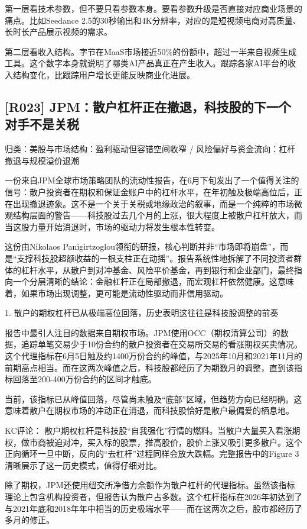 \documentclass[11pt]{ctexart}
\begin{document}
第一层看技术参数，但不要只看参数本身。要看参数升级是否直接对应商业场景的痛点。比如Seedance 2.5的30秒输出和4K分辨率，对应的是短视频电商对高质量、长时长产品展示视频的需求。

第二层看收入结构。字节在MaaS市场接近50\%的份额中，超过一半来自视频生成工具。这个数字本身就说明了哪类AI产品真正在产生收入。跟踪各家AI平台的收入结构变化，比跟踪用户增长更能反映商业化进展。

\subsection{[R023] JPM：散户杠杆正在撤退，科技股的下一个对手不是关税}
{\small\color{refgray}归类：美股与市场结构：盈利驱动但容错空间收窄 / 风险偏好与资金流向：杠杆撤退与规模溢价退潮}

一份来自JPM全球市场策略团队的流动性报告，在6月下旬发出了一个值得关注的信号：散户投资者在期权和保证金账户中的杠杆水平，在年初触及极端高位后，正在出现撤退迹象。这不是一个关于关税或地缘政治的叙事，而是一个纯粹的市场微观结构层面的警告——科技股过去几个月的上涨，很大程度上被散户杠杆放大，而当这股力量开始消退时，市场的驱动力将发生根本性转变。

这份由Nikolaos Panigirtzoglou领衔的研报，核心判断并非“市场即将崩盘”，而是“支撑科技股超额收益的一根支柱正在动摇”。报告系统性地拆解了不同投资者群体的杠杆水平，从散户到对冲基金、风险平价基金，再到银行和企业部门，最终指向一个分层清晰的结论：金融杠杆正在局部撤退，而宏观杠杆依然健康。这意味着，如果市场出现调整，更可能是流动性驱动而非信用驱动。

1. 散户的期权杠杆已从极端高位回落，历史表明这往往是科技股调整的前奏

报告中最引人注目的数据来自期权市场。JPM使用OCC（期权清算公司）的数据，追踪单笔交易少于10份合约的散户投资者在交易所交易的看涨期权买卖情况。这个代理指标在6月5日触及约1400万份合约的峰值，与2025年10月和2021年11月的前期高点相当。而在这两次峰值之后，科技股都经历了为期数月的调整，直到该指标回落至200-400万份合约的区间才触底。

当前，该指标已从峰值回落，尽管尚未触及“底部”区域，但趋势方向已经明确。这意味着散户在期权市场的冲动正在消退，而科技股恰好是散户最偏爱的栖息地。

KC评论： 散户期权杠杆是科技股“自我强化”行情的燃料。当散户大量买入看涨期权，做市商被迫对冲，买入标的股票，推高股价，股价上涨又吸引更多散户。这个正向循环一旦中断，反向的“去杠杆”过程同样会放大跌幅。完整报告中的Figure 3清晰展示了这一历史模式，值得仔细对比。

除了期权，JPM还使用纽交所净借方余额作为散户杠杆的代理指标。虽然该指标理论上包含机构投资者，但报告认为散户占多数。这个杠杆指标在2026年初达到了与2021年底和2018年年中相当的历史极端水平——而在这两次之后，股市都经历了多月的修正。
\end{document}
